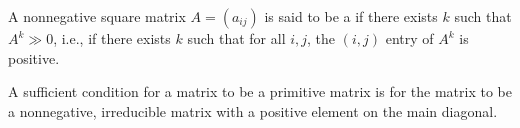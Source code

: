 \documentclass[12pt]{article}
\begin{document}
A nonnegative square matrix $A=(a_{ij})$ is said to be a  if there exists $k$ such that $A^k\gg 0$, i.e., if there exists $k$ such that for all $i,j$, the $(i,j)$ entry of $A^k$ is positive.

A sufficient condition for a matrix to be a primitive matrix is for the matrix to 
be a nonnegative, irreducible matrix with a positive element on the main diagonal.
\end{document}
